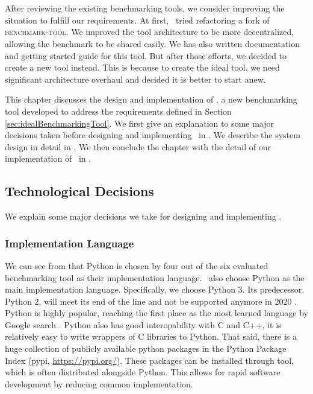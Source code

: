 \fancyhead[LE,RO]{\thepage}

\chapter{\chImplementation}
\label{ch:implementation}

After reviewing the existing benchmarking tools, we consider improving the situation to fulfill our requirements.
At first, \first~tried refactoring a fork of \textsc{benchmark-tool}.
We improved the tool architecture to be more decentralized, allowing the benchmark to be shared easily.
We has also written documentation and getting started guide for this tool.
But after those efforts, we decided to create a new tool instead.
This is because to create the ideal tool, we need significant architecture overhaul and decided it is better to start anew.


This chapter discusses the design and implementation of \OurBenchmarkingTool, a new benchmarking tool developed to address the requirements defined in Section \ref{sec:idealBenchmarkingTool}.
We first give an explanation to some major decisions taken before designing and implementing \OurBenchmarkingTool~in .
We describe the system design in detail in .
We then conclude the chapter with the detail of our implementation of \OurBenchmarkingTool~in .


\section{Technological Decisions}
\label{sec:impl.decisions}

We explain some major decisions we take for designing and implementing \OurBenchmarkingTool.

\subsection{Implementation Language}

We can see from  that Python is chosen by four out of the six evaluated benchmarking tool as their implementation language.
\First~also choose Python as the main implementation language.
Specifically, we choose Python 3.
Its predecessor, Python 2, will meet its end of the line and not be supported anymore in 2020 \citep{petersonPEP373Python2008}.
Python is highly popular, reaching the first place as the most learned language by Google search \citep{carbonnellePYPLPopularitYProgramming2019}.
Python also has good interopability with C and C++, it is relatively easy to write wrappers of C libraries to Python.
That said, there is a huge collection of publicly available python packages in the Python Package Index (pypi, \url{https://pypi.org/}).
These packages can be installed through  tool, which is often distributed alongside Python.
This allows for rapid software development by reducing common implementation.

